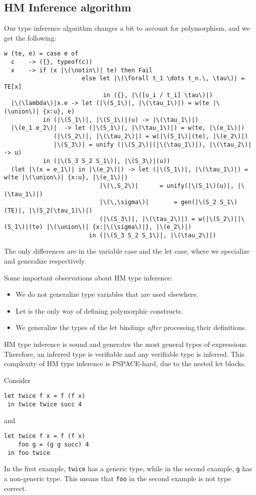 \documentclass[class=scrartcl]{standalone}
\begin{document}
\subsection{HM Inference algorithm}
Our type inference algorithm changes a bit to account for polymorphism,
and we get the following:
\begin{verbatim}
w (te, e) = case e of
  c    -> ({}, typeof(c))
  x    -> if (x |\(\notin\)| te) then Fail
                      else let |\(\forall t_1 \dots t_n.\, \tau\)| = TE[x]
                            in ({}, |\([u_i / t_i] \tau\)|)
  |\(\lambda\)|x.e -> let (|\(S_1\)|, |\(\tau_1\)|) = w(te |\(\union\)| {x:u}, e)
           in (|\(S_1\)|, |\(S_1\)|(u) -> |\(\tau_1\)|)
  |\(e_1 e_2\)|  -> let (|\(S_1\)|, |\(\tau_1\)|) = w(te, |\(e_1\)|)
              (|\(S_2\)|, |\(\tau_2\)|) = w(|\(S_1\)|(te), |\(e_2\)|)
              |\(S_3\)| = unify (|\(S_2\)|(|\(\tau_1\)|), |\(\tau_2\)| -> u)
           in (|\(S_3 S_2 S_1\)|, |\(S_3\)|(u))
  (let |\(x = e_1\)| in |\(e_2\)|) -> let (|\(S_1\)|, |\(\tau_1\)|) = w(te |\(\union\)| {x:u}, |\(e_1\)|)
                           |\(\,S_2\)|      = unify(|\(S_1\)(u)|, |\(\tau_1\)|)
                           |\(\,\sigma\)|       = gen(|\(S_2 S_1\)(TE)|, |\(S_2(\tau_1)\)|)
                           (|\(S_3\)|, |\(\tau_2\)|) = w(|\(S_2\)||\(S_1\)|(te) |\(\union\)| {x:|\(\sigma\)|}, |\(e_2\)|)
                        in (|\(S_3 S_2 S_1\)|, |\(\tau_2\)|)
\end{verbatim}

The only differences are in the variable case and the let case,
where we specialize and generalize respectively.

Some important observations about HM type inference:
\begin{itemize}[nosep]
  \item We do not generalize type variables that are used elsewhere.
  \item Let is the only way of defining polymorphic constructs.
  \item We generalize the types of the let bindings
        \emph{after} processing their definitions.
\end{itemize}

HM type inference is sound and generates the most general types of expressions.
Therefore, an inferred type is verifiable and any verifiable type is inferred.
This complexity of HM type inference is \textsf{PSPACE}-hard,
due to the nested let blocks.

\begin{example}
  Consider
  \begin{verbatim}
let twice f x = f (f x)
 in twice twice succ 4
  \end{verbatim}
  and
  \begin{verbatim}
let twice f x = f (f x)
    foo g = (g g succ) 4
 in foo twice
  \end{verbatim}
  In the first example, \texttt{twice} has a generic type,
  while in the second example, \texttt{g} has a non-generic type.
  This means that \texttt{foo} in
  the second example is not type correct.
\end{example}
\end{document}
